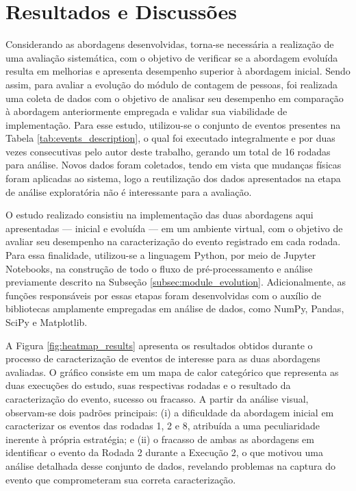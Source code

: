 \section{Resultados e Discussões}
\label{sec:resultados}
Considerando as abordagens desenvolvidas, torna-se necessária a realização de uma avaliação sistemática, com o objetivo de verificar se a abordagem evoluída resulta em melhorias e apresenta desempenho superior à abordagem inicial. Sendo assim, para avaliar a evolução do módulo de contagem de pessoas, foi realizada uma coleta de dados com o objetivo de analisar seu desempenho em comparação à abordagem anteriormente empregada e validar sua viabilidade de implementação. Para esse estudo, utilizou-se o conjunto de eventos presentes na Tabela \ref{tab:events_description}, o qual foi executado integralmente e por duas vezes consecutivas pelo autor deste trabalho, gerando um total de 16 rodadas para análise. Novos dados foram coletados, tendo em vista que mudanças físicas foram aplicadas ao sistema, logo a reutilização dos dados apresentados na etapa de análise exploratória não é interessante para a avaliação. 

O estudo realizado consistiu na implementação das duas abordagens aqui apresentadas — inicial e evoluída — em um ambiente virtual, com o objetivo de avaliar seu desempenho na caracterização do evento registrado em cada rodada. Para essa finalidade, utilizou-se a linguagem Python, por meio de Jupyter Notebooks, na construção de todo o fluxo de pré-processamento e análise previamente descrito na Subseção \ref{subsec:module_evolution}. Adicionalmente, as funções responsáveis por essas etapas foram desenvolvidas com o auxílio de bibliotecas amplamente empregadas em análise de dados, como NumPy, Pandas, SciPy e Matplotlib.

A Figura \ref{fig:heatmap_results} apresenta os resultados obtidos durante o processo de caracterização de eventos de interesse para as duas abordagens avaliadas. O gráfico consiste em um mapa de calor categórico que representa as duas execuções do estudo, suas respectivas rodadas e o resultado da caracterização do evento, sucesso ou fracasso. A partir da análise visual, observam-se dois padrões principais: (i) a dificuldade da abordagem inicial em caracterizar os eventos das rodadas 1, 2 e 8, atribuída a uma peculiaridade inerente à própria estratégia; e (ii) o fracasso de ambas as abordagens em identificar o evento da Rodada 2 durante a Execução 2, o que motivou uma análise detalhada desse conjunto de dados, revelando problemas na captura do evento que comprometeram sua correta caracterização.

